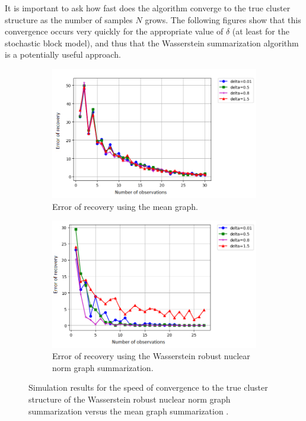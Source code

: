 \documentclass[12pt]{amsart}
\theoremstyle{remark}
\begin{document}
It is important to ask how fast does  the algorithm converge to the true cluster structure as the number of samples $N$ grows. The following figures show that this convergence occurs very quickly for the appropriate value of $\delta$ (at least for the stochastic block model), and thus that the Wasserstein summarization algorithm is a potentially useful approach.

\begin{figure}[H]
     \centering
     \begin{subfigure}[b]{0.8\textwidth}
         \centering
         \includegraphics[width=\textwidth]{./Pictures/speedMean.PNG}
         \caption{Error of recovery using the mean graph.}
     \end{subfigure}
     \hfill
     \begin{subfigure}[b]{0.8\textwidth}
         \centering
         \includegraphics[width=\textwidth]{./Pictures/speedspectral.PNG}
         \caption{Error of recovery using the Wasserstein robust nuclear norm graph summarization.}
     \end{subfigure}
	\caption{Simulation results for the speed of convergence to the true cluster structure of the Wasserstein robust nuclear norm graph summarization versus the mean graph summarization .}
        \label{fig:speed}
\end{figure}
\end{document}
